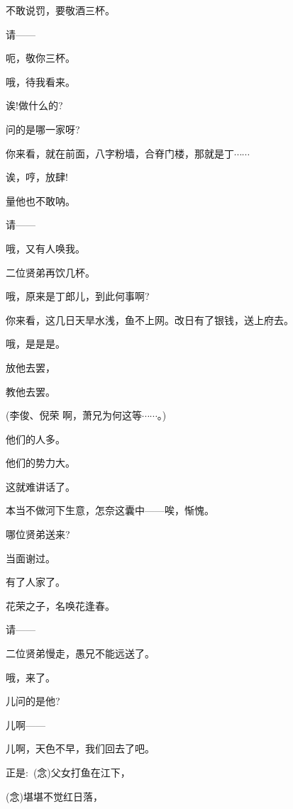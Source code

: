 {不敢说罚，要敬酒三杯。

请------

呃，敬你三杯。

哦，待我看来。

诶!做什么的?

问的是哪一家呀?

你来看，就在前面，八字粉墙，合脊门楼，那就是丁$\cdots{}\cdots{}$

诶，哼，放肆!

量他也不敢呐。

请------

哦，又有人唤我。

二位贤弟再饮几杯。

哦，原来是丁郎儿，到此何事啊?

你来看，这几日天旱水浅，鱼不上网。改日有了银钱，送上府去。

哦，是是是。

放他去罢，

教他去罢。

(李俊、倪荣 啊，萧兄为何这等$\cdots{}\cdots{}$。)

他们的人多。

他们的势力大。

这就难讲话了。

本当不做河下生意，怎奈这囊中------唉，惭愧。

哪位贤弟送来?

当面谢过。

有了人家了。

花荣之子，名唤花逢春。

请------

二位贤弟慢走，愚兄不能远送了。

哦，来了。

儿问的是他?

儿啊------



{儿啊，天色不早，我们回去了吧。}

{正是:~({\akai 念})父女打鱼在江下，}

{({\akai 念})堪堪不觉红日落，}

\vspace{5pt}


}
